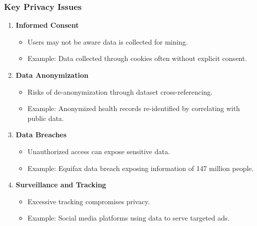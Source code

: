 \documentclass[aspectratio=169]{beamer}
\begin{document}
\begin{frame}[fragile]
    \frametitle{Key Privacy Issues}
    \begin{enumerate}
        \item \textbf{Informed Consent}
            \begin{itemize}
                \item Users may not be aware data is collected for mining.
                \item Example: Data collected through cookies often without explicit consent.
            \end{itemize}
        
        \item \textbf{Data Anonymization}
            \begin{itemize}
                \item Risks of de-anonymization through dataset cross-referencing.
                \item Example: Anonymized health records re-identified by correlating with public data.
            \end{itemize}
        
        \item \textbf{Data Breaches}
            \begin{itemize}
                \item Unauthorized access can expose sensitive data.
                \item Example: Equifax data breach exposing information of 147 million people.
            \end{itemize}
        
        \item \textbf{Surveillance and Tracking}
            \begin{itemize}
                \item Excessive tracking compromises privacy.
                \item Example: Social media platforms using data to serve targeted ads.
            \end{itemize}
    \end{enumerate}
\end{frame}
\end{document}

